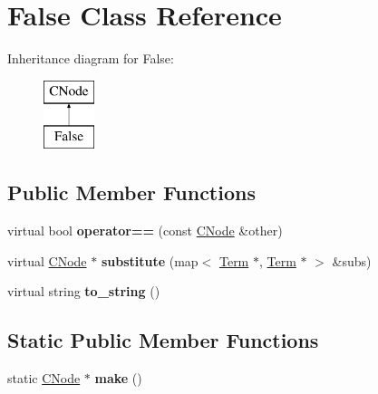 \hypertarget{classFalse}{\section{\-False \-Class \-Reference}
\label{classFalse}
}
\-Inheritance diagram for \-False\-:\begin{figure}[H]
\begin{center}
\leavevmode
\includegraphics[height=2.000000cm]{classFalse}
\end{center}
\end{figure}
\subsection*{\-Public \-Member \-Functions}
\begin{DoxyCompactItemize}
\item 
\hypertarget{classFalse_aa5a4738c7d2296953282ead016ac6b25}{virtual bool {\bfseries operator==} (const \hyperlink{classCNode}{\-C\-Node} \&other)}\label{classFalse_aa5a4738c7d2296953282ead016ac6b25}

\item 
\hypertarget{classFalse_a1c34f63f8f6f3949f0ab9e44257b3061}{virtual \hyperlink{classCNode}{\-C\-Node} $\ast$ {\bfseries substitute} (map$<$ \hyperlink{classTerm}{\-Term} $\ast$, \hyperlink{classTerm}{\-Term} $\ast$ $>$ \&subs)}\label{classFalse_a1c34f63f8f6f3949f0ab9e44257b3061}

\item 
\hypertarget{classFalse_a1cae1258ee20b432f44bf20fb78ade0b}{virtual string {\bfseries to\-\_\-string} ()}\label{classFalse_a1cae1258ee20b432f44bf20fb78ade0b}

\end{DoxyCompactItemize}
\subsection*{\-Static \-Public \-Member \-Functions}
\begin{DoxyCompactItemize}
\item 
\hypertarget{classFalse_ae7d34903159164e27ac65c62660fc610}{static \hyperlink{classCNode}{\-C\-Node} $\ast$ {\bfseries make} ()}\label{classFalse_ae7d34903159164e27ac65c62660fc610}

\end{DoxyCompactItemize}
